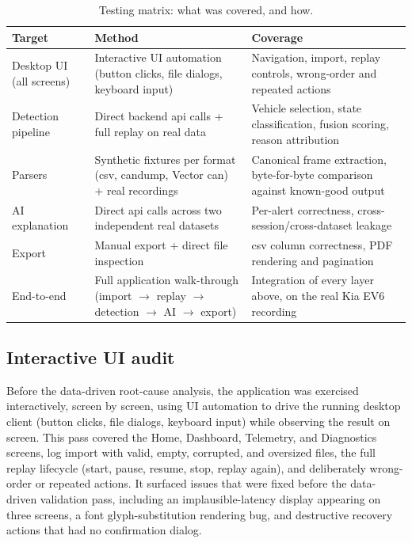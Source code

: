 \begin{table}[H]
\centering
\caption{Testing matrix: what was covered, and how.}
\label{tab:testing-matrix}
\begin{tabularx}{\textwidth}{@{}lXX@{}}
\toprule
\textbf{Target} & \textbf{Method} & \textbf{Coverage} \\
\midrule
Desktop UI (all screens) & Interactive UI automation (button clicks, file dialogs, keyboard input) & Navigation, import, replay controls, wrong-order and repeated actions \\
Detection pipeline & Direct backend \gls{api} calls + full replay on real data & Vehicle selection, state classification, fusion scoring, reason attribution \\
Parsers & Synthetic fixtures per format (\gls{csv}, candump, Vector \gls{can}) + real recordings & Canonical frame extraction, byte-for-byte comparison against known-good output \\
AI explanation & Direct \gls{api} calls across two independent real datasets & Per-alert correctness, cross-session/cross-dataset leakage \\
Export & Manual export + direct file inspection & \gls{csv} column correctness, PDF rendering and pagination \\
End-to-end & Full application walk-through (import $\to$ replay $\to$ detection $\to$ AI $\to$ export) & Integration of every layer above, on the real Kia EV6 recording \\
\bottomrule
\end{tabularx}
\end{table}

\subsection{Interactive UI audit}

Before the data-driven root-cause analysis, the application was exercised interactively, screen by screen, using UI automation to drive the running desktop client (button clicks, file dialogs, keyboard input) while observing the result on screen. This pass covered the Home, Dashboard, Telemetry, and Diagnostics screens, log import with valid, empty, corrupted, and oversized files, the full replay lifecycle (start, pause, resume, stop, replay again), and deliberately wrong-order or repeated actions. It surfaced issues that were fixed before the data-driven validation pass, including an implausible-latency display appearing on three screens, a font glyph-substitution rendering bug, and destructive recovery actions that had no confirmation dialog.

